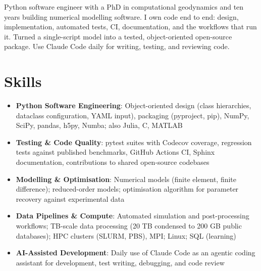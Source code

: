 \documentclass[11pt,a4paper,sans]{moderncv}
\begin{document}
\makecvtitle


\vspace{6pt}
\small{Python software engineer with a PhD in computational geodynamics and ten years building numerical modelling software. I own code end to end: design, implementation, automated tests, CI, documentation, and the workflows that run it. Turned a single-script model into a tested, object-oriented open-source package. Use Claude Code daily for writing, testing, and reviewing code.}


\section{Skills}
\vspace{1pt}
\begin{itemize}

\item \textbf{Python Software Engineering}: Object-oriented design (class hierarchies, dataclass configuration, YAML input), packaging (pyproject, pip), NumPy, SciPy, pandas, h5py, Numba; also Julia, C, MATLAB

\item \textbf{Testing \& Code Quality}: pytest suites with Codecov coverage, regression tests against published benchmarks, GitHub Actions CI, Sphinx documentation, contributions to shared open-source codebases

\item \textbf{Modelling \& Optimisation}: Numerical models (finite element, finite difference); reduced-order models; optimisation algorithm for parameter recovery against experimental data

\item \textbf{Data Pipelines \& Compute}: Automated simulation and post-processing workflows; TB-scale data processing (20 TB condensed to 200 GB public databases); HPC clusters (SLURM, PBS), MPI; Linux; SQL (learning)

\item \textbf{AI-Assisted Development}: Daily use of Claude Code as an agentic coding assistant for development, test writing, debugging, and code review

\end{itemize}
\end{document}
